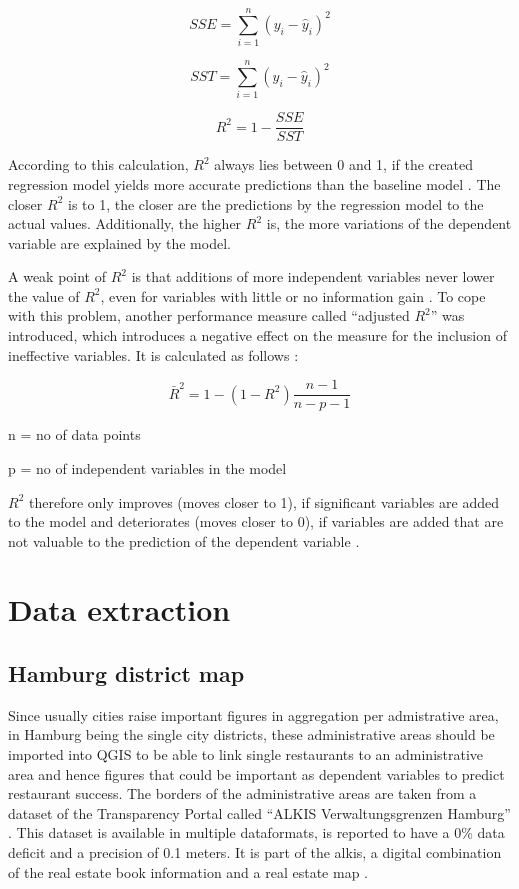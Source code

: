 \documentclass[a4paper, 11pt, oneside]{Thesis}  %
\begin{document}
\[SSE = \sum\limits_{i=1}^n (y_{i} - \hat{y}_{i})^2\]

\[SST = \sum\limits_{i=1}^n (y_{i} - \hat{y}_{i})^2\]

\[ R^2 = 1 - \frac{SSE}{SST}\]

According to this calculation, $R^2$ always lies between 0 and 1, if the created regression model yields more accurate predictions than the baseline model \cite{Devasthali.2018}. The closer $R^2$ is to 1, the closer are the predictions by the regression model to the actual values. Additionally, the higher $R^2$ is, the more variations of the dependent variable are explained by the model.

A weak point of $R^2$ is that additions of more independent variables never lower the value of $R^2$, even for variables with little or no information gain \cite{Devasthali.2018}. To cope with this problem, another performance measure called ``adjusted $R^2$'' was introduced, which introduces a negative effect on the measure for the inclusion of ineffective variables. It is calculated as follows \cite{Devasthali.2018}:

\[ \bar{R}^2 = 1 - (1-R^2)\frac{n-1}{n-p-1}\]

n = no of data points

p = no of independent variables in the model

$R^2$ therefore only improves (moves closer to 1), if significant variables are added to the model and deteriorates (moves closer to 0), if variables are added that are not valuable to the prediction of the dependent variable \cite{Devasthali.2018}. 

\chapter{Data extraction}
\label{Data extraction}

\section{Hamburg district map}

Since usually cities raise important figures in aggregation per admistrative area, in Hamburg being the single city districts, these administrative areas should be imported into QGIS to be able to link single restaurants to an administrative area and hence figures that could be important as dependent variables to predict restaurant success. The borders of the administrative areas are taken from a dataset of the Transparency Portal called ``ALKIS Verwaltungsgrenzen Hamburg'' \cite{LandesbetriebGeoinformationundVermessung.28.02.2018}. This dataset is available in multiple dataformats, is reported to have a 0\% data deficit and a precision of 0.1 meters. It is part of the \ac{alkis}, a digital combination of the real estate book information and a real estate map \cite{ALKIS2019}.
\end{document}

